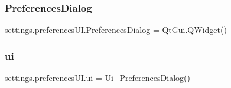 \hypertarget{namespacesettings_1_1preferences_u_i_a70162ca377a00273f0795162093f7958}{}\label{namespacesettings_1_1preferences_u_i_a70162ca377a00273f0795162093f7958} 
\subsubsection{\texorpdfstring{Preferences\+Dialog}{PreferencesDialog}}
{\footnotesize\ttfamily settings.\+preferences\+U\+I.\+Preferences\+Dialog = Qt\+Gui.\+Q\+Widget()}

\hypertarget{namespacesettings_1_1preferences_u_i_ae448bdbd0fb6bba061e4735237500ea5}{}\label{namespacesettings_1_1preferences_u_i_ae448bdbd0fb6bba061e4735237500ea5} 
\subsubsection{\texorpdfstring{ui}{ui}}
{\footnotesize\ttfamily settings.\+preferences\+U\+I.\+ui = \hyperlink{classsettings_1_1preferences_u_i_1_1_ui___preferences_dialog}{Ui\+\_\+\+Preferences\+Dialog}()}

